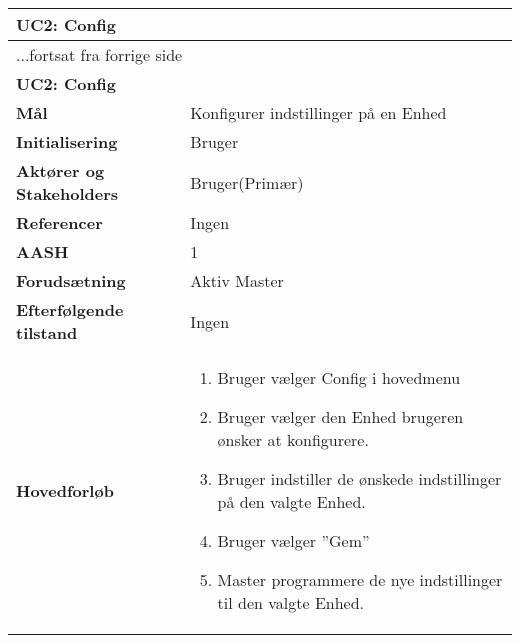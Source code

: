 \begin{center} \centering \label{UC2}
	\begin{longtable}{|p{5cm}|p{9cm}|}  %
	\hline
		\multicolumn{2}{|l|}{\textbf{UC2: Config}} \\\hline %
		\endfirsthead
		
		\multicolumn{2}{l}{...fortsat fra forrige side} \\ \hline %
		\multicolumn{2}{|l|}{\textbf{UC2: Config}} \\\hline %
		\endhead	
		
		\textbf{Mål}								&Konfigurer indstillinger på en Enhed			\\\hline
		\textbf{Initialisering}					&Bruger							\\\hline
		\textbf{Aktører og Stakeholders}			&Bruger(Primær)					\\\hline
		\textbf{Referencer}						&Ingen							\\\hline
		\textbf{AASH}							&1								\\\hline
		\textbf{Forudsætning}					&Aktiv Master					\\\hline
		\textbf{Efterfølgende tilstand}			&Ingen							\\\hline
		\textbf{Hovedforløb}					
			&\begin{enumerate}
	
				\item Bruger vælger Config i hovedmenu
				
				\item Bruger vælger den Enhed brugeren ønsker at konfigurere.
				
				\item Bruger indstiller de ønskede indstillinger på den valgte Enhed.
				
				\item Bruger vælger ''Gem''
				
				\item Master programmere de nye indstillinger til den valgte Enhed. 
	
			\end{enumerate}\\\hline
	\end{longtable}
\end{center}


